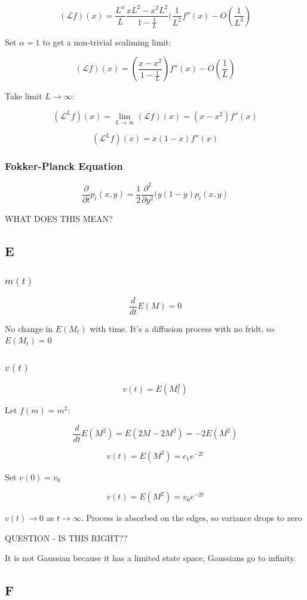 \documentclass{article}
\begin{document}
$$(\mathcal{L}f)(x) = \frac{L^\alpha}{L} \frac{xL^2 - x^2L^2}{1-\frac{1}{L}}(\frac{1}{L^2}f''(x) - O(\frac{1}{L^3})$$

Set $\alpha=1$ to get a non-trivial scaliming limit:

$$(\mathcal{L}f)(x) = (\frac{x - x^2}{1-\frac{1}{L}})f''(x) - O(\frac{1}{L})$$

Take limit $L \to \infty$:

$$(\mathcal{L}^Lf)(x) = \lim_{L \to \infty} (\mathcal{L}f)(x) = (x - x^2)f''(x)$$

$$(\mathcal{L}^Lf)(x) = x(1 - x)f''(x)$$

\subsubsection{Fokker-Planck Equation}

$$\frac{\partial}{\partial t}p_t(x,y) = \frac{1}{2} \frac{\partial^2}{\partial y^2} (y(1-y) p_t(x,y)$$

WHAT DOES THIS MEAN?

\subsection{E}

\subsubsection{$m(t)$}

$$\frac{d}{dt}E(M) = 0$$

No change in $E(M_t)$ with time. It's a diffusion process with no fridt, so $E(M_t) = 0$

\subsubsection{$v(t)$}

$$v(t) = E(M_t^2)$$

Let $f(m) = m^2$:

$$\frac{d}{dt}E(M^2) = E(2M-2M^2) = -2E(M^2)$$

$$v(t) = E(M^2) = c_1 e^{-2t}$$

Set $v(0) = v_0$

$$v(t) = E(M^2) = v_0 e^{-2t}$$

$v(t) \to 0$ as $t \to \infty$. Process is absorbed on the edges, so variance drops to zero

QUESTION - IS THIS RIGHT?? 

It is not Gaussian because it has a limited state space, Gaussians go to infinity.

\subsection{F}
\end{document}

